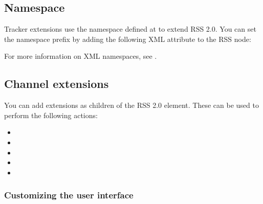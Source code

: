 \documentclass[letterpaper,12pt,english,openany,oneside]{sphinxmanual}
\begin{document}
\subsection{Namespace}
\label{\detokenize{Tracker_InboxAPI:namespace}}
Tracker extensions use the namespace defined at  to extend RSS 2.0. You can set the namespace prefix by adding the following XML attribute to the RSS node:

\begin{sphinxVerbatim}[commandchars=\\\{\}]
\end{sphinxVerbatim}

For more information on XML namespaces, see  .




\subsection{Channel extensions}
\label{\detokenize{Tracker_InboxAPI:channel-extensions}}
You can add extensions as children of the RSS 2.0  element. These can be used to perform the following actions:
\begin{itemize}
\item {} 

\item {} 

\item {} 

\item {} 

\item {} 

\end{itemize}




\subsubsection{Customizing the user interface}
\label{\detokenize{Tracker_InboxAPI:customizing-the-user-interface}}
\begin{sphinxVerbatim}[commandchars=\\\{\}]
\end{sphinxVerbatim}
\end{document}
